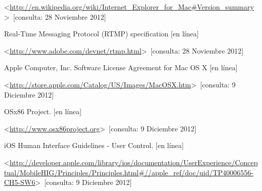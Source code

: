 \begin{thebibliography}{99}
\begin{sloppypar}
\textless \url{http://en.wikipedia.org/wiki/Internet_Explorer_for_Mac\#Version_summary}\textgreater \ [consulta: 28 Noviembre 2012]

%
Real-Time Messaging Protocol (RTMP) specification [en línea]\

\textless \url{http://www.adobe.com/devnet/rtmp.html}\textgreater \ [consulta: 28 Noviembre 2012]

%
Apple Computer, Inc. Software License Agreement for Mac OS X [en línea]\

\textless \url{http://store.apple.com/Catalog/US/Images/MacOSX.htm}\textgreater \ [consulta: 9 Diciembre 2012]

%
OSx86 Project. [en línea]\

\textless \url{http://www.osx86project.org}\textgreater \ [consulta: 9 Diciembre 2012]

%
iOS Human Interface Guidelines - User Control. [en línea]\

\textless \url{http://developer.apple.com/library/ios/documentation/UserExperience/Conceptual/MobileHIG/Principles/Principles.html\#//apple_ref/doc/uid/TP40006556-CH5-SW6}\textgreater \ [consulta: 9 Diciembre 2012]


\end{sloppypar}
\end{thebibliography}
